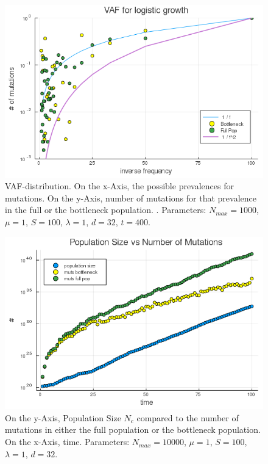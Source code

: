 \documentclass{article}
\numberwithin{equation}{subsection}
\begin{document}
	\begin{figure}[h!]
	\centering
	\includegraphics[width=\linewidth]{Figures/LogGrowth/document/vargrowth/LogVarTimesC_N10000_mu1_t400_d256_C0}

	
	\caption{VAF-distribution. On the x-Axis, the possible prevalences for mutations. On the y-Axis, number of mutations for that prevalence in the full or the bottleneck population. . Parameters: $ N_{max} = 1000$, $\mu = 1 $, $ S = 100 $, $ \lambda = 1$, $ d = 32 $,  $ t = 400 $.}
	\label{fig::VAFD}
	\end{figure}	
	
		\begin{figure}[h!]
		\centering
		\includegraphics[width=\linewidth]{Figures/LogGrowth/document/vargrowth/LogVarTimesMutLive_N10000_mu1_t100_d32_C0}
		
		\caption{On the y-Axis, Population Size $N_c$ compared to the number of mutations in either the full population or the bottleneck population. On the x-Axis, time. Parameters: $ N_{max} = 10000$, $\mu = 1 $, $ S = 100 $, $ \lambda = 1$, $ d = 32 $.}
		\label{fig::NMutstimeD2}
	\end{figure}
	
\end{document}
